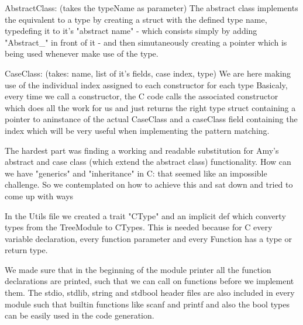 AbstractClass: (takes the typeName as parameter)
The abstract class implements the equivalent to a type by creating a struct with the defined type name, typedefing it to
it's "abstract name" - which consists simply by adding "Abstract_" in front of it - and then simutaneously creating a pointer
which is being used whenever make use of the type.

CaseClass: (takes: name, list of it's fields, case index, type)
We are here making use of the individual index assigned to each constructor for each type
Basicaly, every time we call a constructor, the C code calls the associated constructor which does all the work for us and
just returns the right type struct containing a pointer to aninstance of the actual CaseClass and a caseClass field containing
the index which will be very useful when implementing the pattern matching.

The hardest part was finding a working and readable substitution for Amy's abstract and case class (which extend the abstract class) functionality.
How can we have "generics" and "inheritance" in C: that seemed like an impossible challenge.
So we contemplated on how to achieve this and sat down and tried to come up with ways

In the Utils file we created a trait "CType" and an implicit def which converty types from the TreeModule to CTypes.
This is needed because for C every variable declaration, every function parameter and every Function has a type or return type.

We made sure that in the beginning of the module printer all the function declarations are printed, such that we can call on functions before we implement them.
The stdio, stdlib, string and stdbool header files are also included in every module such that builtin functions like scanf and printf and also the bool types can be easily used in the code generation.
